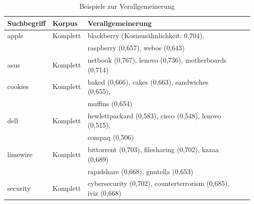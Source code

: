\documentclass[12pt,a4paper]{report}
\begin{document}
		
\begin{table}[h]
\caption{Beispiele zur Verallgemeinerung}
\begin{center}
\begin{tabular}{|l||l|l|l|l|}
\hline
Suchbegriff & Korpus & Verallgemeinerung   \\
\hline
\hline
 apple & Komplett & blackberry (Kosinusähnlichkeit: 0,704),\\
 	&	& raspberry (0,657), webos (0,643)\\
 \hline
 asus	   & Komplett & netbook (0,767), lenovo (0,736), motherboards (0,714) \\
\hline
 cookies	& Komplett& baked (0,666), cakes (0,663), sandwiches (0,655),\\
 & & muffins (0,654)	\\
 	\hline
 dell	 & Komplett & hewlettpackard (0,583), cisco (0,548), lenovo (0,515),\\
 && compaq (0,506) \\
 \hline
 limewire	& Komplett& bittorrent (0,703), filesharing (0,702), kazaa (0,689)\\
 &&rapidshare (0,668), gnutella (0,653)\\
 	\hline
 security	&	Komplett&	cybersecurity (0,702), counterterrorism (0,685), iviz (0,668) \\
 	\hline
 
\end{tabular}
\end{center}
\end{table}
\end{document}
